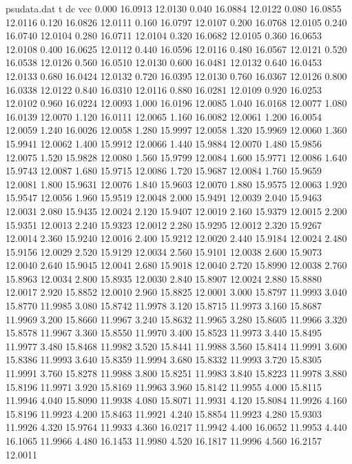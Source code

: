 \begin{filecontents*}{psudata.dat}
t dc vcc
0.000 16.0913 12.0130
0.040 16.0884 12.0122
0.080 16.0855 12.0116
0.120 16.0826 12.0111
0.160 16.0797 12.0107
0.200 16.0768 12.0105
0.240 16.0740 12.0104
0.280 16.0711 12.0104
0.320 16.0682 12.0105
0.360 16.0653 12.0108
0.400 16.0625 12.0112
0.440 16.0596 12.0116
0.480 16.0567 12.0121
0.520 16.0538 12.0126
0.560 16.0510 12.0130
0.600 16.0481 12.0132
0.640 16.0453 12.0133
0.680 16.0424 12.0132
0.720 16.0395 12.0130
0.760 16.0367 12.0126
0.800 16.0338 12.0122
0.840 16.0310 12.0116
0.880 16.0281 12.0109
0.920 16.0253 12.0102
0.960 16.0224 12.0093
1.000 16.0196 12.0085
1.040 16.0168 12.0077
1.080 16.0139 12.0070
1.120 16.0111 12.0065
1.160 16.0082 12.0061
1.200 16.0054 12.0059
1.240 16.0026 12.0058
1.280 15.9997 12.0058
1.320 15.9969 12.0060
1.360 15.9941 12.0062
1.400 15.9912 12.0066
1.440 15.9884 12.0070
1.480 15.9856 12.0075
1.520 15.9828 12.0080
1.560 15.9799 12.0084
1.600 15.9771 12.0086
1.640 15.9743 12.0087
1.680 15.9715 12.0086
1.720 15.9687 12.0084
1.760 15.9659 12.0081
1.800 15.9631 12.0076
1.840 15.9603 12.0070
1.880 15.9575 12.0063
1.920 15.9547 12.0056
1.960 15.9519 12.0048
2.000 15.9491 12.0039
2.040 15.9463 12.0031
2.080 15.9435 12.0024
2.120 15.9407 12.0019
2.160 15.9379 12.0015
2.200 15.9351 12.0013
2.240 15.9323 12.0012
2.280 15.9295 12.0012
2.320 15.9267 12.0014
2.360 15.9240 12.0016
2.400 15.9212 12.0020
2.440 15.9184 12.0024
2.480 15.9156 12.0029
2.520 15.9129 12.0034
2.560 15.9101 12.0038
2.600 15.9073 12.0040
2.640 15.9045 12.0041
2.680 15.9018 12.0040
2.720 15.8990 12.0038
2.760 15.8963 12.0034
2.800 15.8935 12.0030
2.840 15.8907 12.0024
2.880 15.8880 12.0017
2.920 15.8852 12.0010
2.960 15.8825 12.0001
3.000 15.8797 11.9993
3.040 15.8770 11.9985
3.080 15.8742 11.9978
3.120 15.8715 11.9973
3.160 15.8687 11.9969
3.200 15.8660 11.9967
3.240 15.8632 11.9965
3.280 15.8605 11.9966
3.320 15.8578 11.9967
3.360 15.8550 11.9970
3.400 15.8523 11.9973
3.440 15.8495 11.9977
3.480 15.8468 11.9982
3.520 15.8441 11.9988
3.560 15.8414 11.9991
3.600 15.8386 11.9993
3.640 15.8359 11.9994
3.680 15.8332 11.9993
3.720 15.8305 11.9991
3.760 15.8278 11.9988
3.800 15.8251 11.9983
3.840 15.8223 11.9978
3.880 15.8196 11.9971
3.920 15.8169 11.9963
3.960 15.8142 11.9955
4.000 15.8115 11.9946
4.040 15.8090 11.9938
4.080 15.8071 11.9931
4.120 15.8084 11.9926
4.160 15.8196 11.9923
4.200 15.8463 11.9921
4.240 15.8854 11.9923
4.280 15.9303 11.9926
4.320 15.9764 11.9933
4.360 16.0217 11.9942
4.400 16.0652 11.9953
4.440 16.1065 11.9966
4.480 16.1453 11.9980
4.520 16.1817 11.9996
4.560 16.2157 12.0011

\end{filecontents*}
